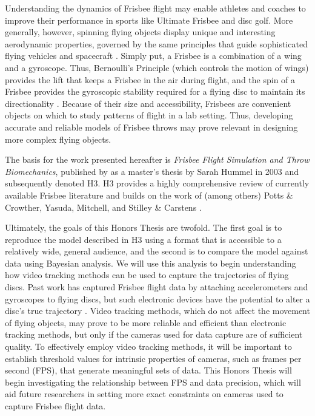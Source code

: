 \documentclass[a4paper,12pt, oneside]{article}
\begin{document}
Understanding the dynamics of Frisbee flight may enable athletes and coaches to improve their performance in sports like Ultimate Frisbee and disc golf.  More generally, however, spinning flying objects display unique and interesting aerodynamic properties, governed by the same principles that guide sophisticated flying vehicles and spacecraft \cite{lorenz2004}. Simply put, a Frisbee is a combination of a wing and a gyroscope. Thus, Bernoulli's Principle (which controls the motion of wings) provides the lift that keeps a Frisbee in the air during flight, and the spin of a Frisbee provides the gyroscopic stability required for a flying disc to maintain its directionality \cite{morrison}. Because of their size and accessibility, Frisbees are convenient objects on which to study patterns of flight in a lab setting. Thus, developing accurate and reliable models of Frisbee throws may prove relevant in designing more complex flying objects. 
 
The basis for the work presented hereafter is \textit{Frisbee Flight Simulation and Throw Biomechanics}, published by as a master's thesis by Sarah Hummel in 2003 and subsequently denoted H3. H3 provides a highly comprehensive review of currently available Frisbee literature and builds on the work of (among others) Potts \& Crowther, Yasuda, Mitchell, and Stilley \& Carstens \cite{H3, pottsandcrowther2007, yasuda, mitchell, stilleyandcarstens}. 

Ultimately, the goals of this Honors Thesis are twofold. The first goal is to reproduce the model described in H3 using a format that is accessible to a relatively wide, general audience, and the second is to compare the model against data using Bayesian analysis. We will use this analysis to begin understanding how video tracking methods can be used to capture the trajectories of flying discs. Past work has captured Frisbee flight data by attaching accelerometers and gyroscopes to flying discs, but such electronic devices have the potential to alter a disc's true trajectory \cite{lorenz2004}. Video tracking methods, which do not affect the movement of flying objects, may prove to be more reliable and efficient than electronic tracking methods, but only if the cameras used for data capture are of sufficient quality. To effectively employ video tracking methods, it will be important to establish threshold values for intrinsic properties of cameras, such as frames per second (FPS), that generate meaningful sets of data. This Honors Thesis will begin investigating the relationship between FPS and data precision, which will aid future researchers in setting more exact constraints on cameras used to capture Frisbee flight data. 
\end{document}
